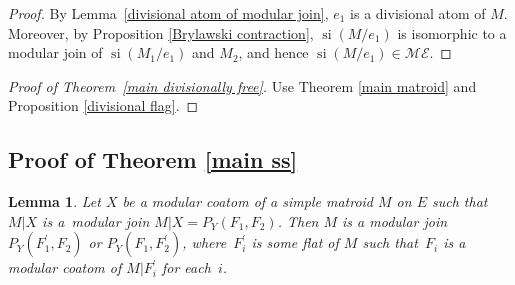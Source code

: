 \documentclass[pdftex]{sigma}
\numberwithin{equation}{section}
\newtheorem{Lemma}[Theorem]{Lemma}
\DeclareMathOperator{\si}{si}
\begin{document}
\begin{proof}
By Lemma~\ref{divisional atom of modular join}, $ e_{1} $ is a divisional atom of $ M $.
Moreover, by Proposition \ref{Brylawski contraction}, $ \si(M/e_{1}) $ is isomorphic to a modular join of $ \si(M_{1}/e_{1}) $ and $ M_{2} $, and hence $ \si(M/e_{1}) \in \mathcal{ME} $.
\end{proof}

\begin{proof}[Proof of Theorem~\ref{main divisionally free}] Use Theorem \ref{main matroid} and Proposition \ref{divisional flag}.
\end{proof}

\subsection{Proof of Theorem \ref{main ss}}
\begin{Lemma}\label{lemma ss}
Let $ X $ be a modular coatom of a simple matroid $ M $ on $ E $ such that $ M|X $ is a~modular join $ M|X=P_{Y}(F_{1},F_{2}) $.
Then $ M $ is a modular join $ P_{Y}(F_{1}^{\prime}, F_{2}) $ or $ P_{Y}(F_{1}, F_{2}^{\prime}) $, where~$ F_{i}^{\prime} $ is some flat of $ M $ such that~$ F_{i} $ is a modular coatom of $ M|F_{i}^{\prime} $ for each~$ i $.
\end{Lemma}
\end{document}
